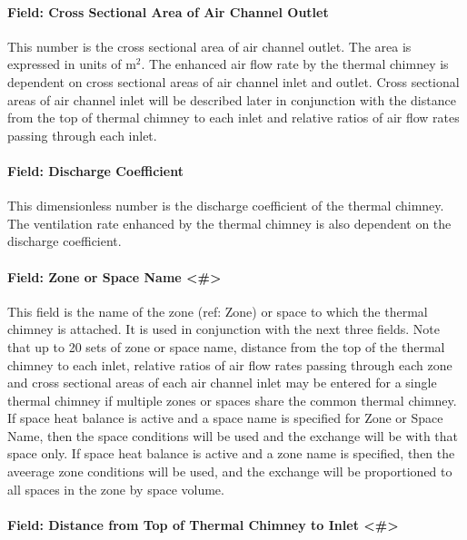 \paragraph{Field: Cross Sectional Area of Air Channel Outlet}\label{field-cross-sectional-area-of-air-channel-outlet}

This number is the cross sectional area of air channel outlet. The area is expressed in units of m\(^{2}\). The enhanced air flow rate by the thermal chimney is dependent on cross sectional areas of air channel inlet and outlet. Cross sectional areas of air channel inlet will be described later in conjunction with the distance from the top of thermal chimney to each inlet and relative ratios of air flow rates passing through each inlet.

\paragraph{Field: Discharge Coefficient}\label{field-discharge-coefficient-000}

This dimensionless number is the discharge coefficient of the thermal chimney. The ventilation rate enhanced by the thermal chimney is also dependent on the discharge coefficient.

\paragraph{Field: Zone or Space Name \textless{}\#\textgreater{}}\label{field-zone-name-8}

This field is the name of the zone (ref: Zone) or space to which the thermal chimney is attached. It is used in conjunction with the next three fields. Note that up to 20 sets of zone or space name, distance from the top of the thermal chimney to each inlet, relative ratios of air flow rates passing through each zone and cross sectional areas of each air channel inlet may be entered for a single thermal chimney if multiple zones or spaces share the common thermal chimney.  If space heat balance is active and a space name is specified for Zone or Space Name, then the space conditions will be used and the exchange will be with that space only. If space heat balance is active and a zone name is specified, then the aveerage zone conditions will be used, and the exchange will be proportioned to all spaces in the zone by space volume.

\paragraph{Field: Distance from Top of Thermal Chimney to Inlet \textless{}\#\textgreater{}}\label{field-distance-from-top-of-thermal-chimney-to-inlet}

